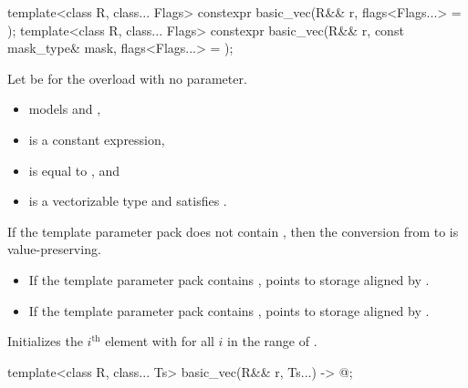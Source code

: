 \begin{itemdecl}
template<class R, class... Flags>
  constexpr basic_vec(R&& r, flags<Flags...> = {});
template<class R, class... Flags>
  constexpr basic_vec(R&& r, const mask_type& mask, flags<Flags...> = {});
\end{itemdecl}

\begin{itemdescr}
\pnum
Let  be  for the overload with no
 parameter.

\pnum
\constraints
\begin{itemize}
\item {} models  and
  ,
\item {} is a constant expression,
\item {} is equal to , and
\item {} is a vectorizable type and
  satisfies .
\end{itemize}

\pnum
\mandates
If the template parameter pack  does not contain
, then the conversion from
 to  is value-preserving.

\pnum
\expects
\begin{itemize}
 \item
   If the template parameter pack  contains
   ,  points to
   storage aligned by .
 \item
   If the template parameter pack  contains
   ,  points to
   storage aligned by .
\end{itemize}

\pnum
\effects
Initializes the $i^\text{th}$ element with  for all $i$ in the
range of .
\end{itemdescr}

\begin{itemdecl}
template<class R, class... Ts>
  basic_vec(R&& r, Ts...) -> @\seebelow@;
\end{itemdecl}

